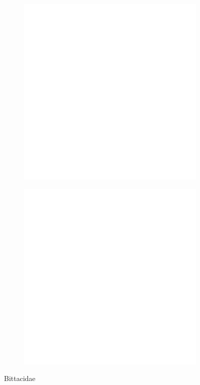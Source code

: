 \documentclass[letterpaper, 11pt]{article}
\begin{document}
\begin{figure}[ht!]
    \centering
    \begin{subfigure}[ht!]{0.25\textwidth}
        \includegraphics[width=\textwidth]{blank}
        \caption{}
        \label{fig:bittac1}
    \end{subfigure}
    \qquad %
    \begin{subfigure}[ht!]{0.5\textwidth}
        \includegraphics[width=\textwidth]{blank}
        \caption{}
        \label{fig:bittac2}
    \end{subfigure}
    \caption{Bittacidae}\label{fig:bittacids}
\end{figure}
\end{document}
